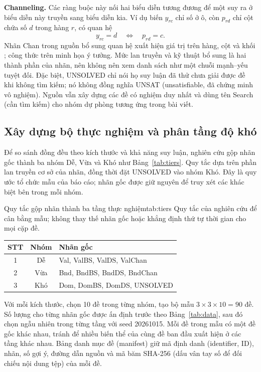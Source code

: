 \documentclass[a4paper]{cas-sc}
\begin{document}
\textbf{Channeling.} Các ràng buộc này nối hai biểu diễn tương đương để một suy ra ở biểu diễn này truyền sang biểu diễn kia. Ví dụ biến $y_{rc}$ chỉ số ở ô, còn $p_{rd}$ chỉ cột chứa số $d$ trong hàng $r$, có quan hệ
\begin{equation}
y_{rc}=d\quad\Longleftrightarrow\quad p_{rd}=c.
\end{equation}
Nhãn Chan trong nguồn bổ sung quan hệ xuất hiện giá trị trên hàng, cột và khối \citep{lagerkvist2026}; công thức trên minh họa ý tưởng. Mức lan truyền và kỹ thuật bổ sung là hai thành phần của nhãn, nên không nên xem danh sách như một chuỗi mạnh--yếu tuyệt đối. Đặc biệt, UNSOLVED chỉ nói họ suy luận đã thử chưa giải được đề khi không tìm kiếm; nó không đồng nghĩa UNSAT (unsatisfiable, đã chứng minh vô nghiệm). Nguồn vẫn xây dựng các đề có nghiệm duy nhất và dùng tên Search (cần tìm kiếm) cho nhóm dự phòng tương ứng trong bài viết.

\subsection{Xây dựng bộ thực nghiệm và phân tầng độ khó}
Để so sánh đồng đều theo kích thước và khả năng suy luận, nghiên cứu gộp nhãn gốc thành ba nhóm Dễ, Vừa và Khó như Bảng~\ref{tab:tiers}. Quy tắc dựa trên phần lan truyền cơ sở của nhãn, đồng thời đặt UNSOLVED vào nhóm Khó. Đây là quy ước tổ chức mẫu của báo cáo; nhãn gốc được giữ nguyên để truy xét các khác biệt bên trong mỗi nhóm.

\begin{reporttable}{Quy tắc gộp nhãn thành ba tầng thực nghiệm}{tab:tiers}{%
Quy tắc của nghiên cứu để cân bằng mẫu; không thay thế nhãn gốc hoặc khẳng định thứ tự thời gian cho mọi cặp đề.}
\begin{tabular}{|c|c|l|}
\hline
\textbf{STT} & \textbf{Nhóm} & \textbf{Nhãn gốc}\\\hline
1 & Dễ & Val, ValBS, ValDS, ValChan\\
2 & Vừa & Bnd, BndBS, BndDS, BndChan\\
3 & Khó & Dom, DomBS, DomDS, UNSOLVED\\\hline
\end{tabular}
\end{reporttable}

Với mỗi kích thước, chọn 10 đề trong từng nhóm, tạo bộ mẫu $3\times3\times10=90$ đề. Số lượng cho từng nhãn gốc được ấn định trước theo Bảng~\ref{tab:data}, sau đó chọn ngẫu nhiên trong từng tầng với seed 20261015. Mỗi đề trong mẫu có một đề gốc khác nhau, tránh để nhiều biến thể của cùng đề ban đầu xuất hiện ở các tầng khác nhau. Bảng danh mục đề (manifest) giữ mã định danh (identifier, ID), nhãn, số gợi ý, đường dẫn nguồn và mã băm SHA-256 (dấu vân tay số để đối chiếu nội dung tệp) của mỗi đề.
\end{document}
